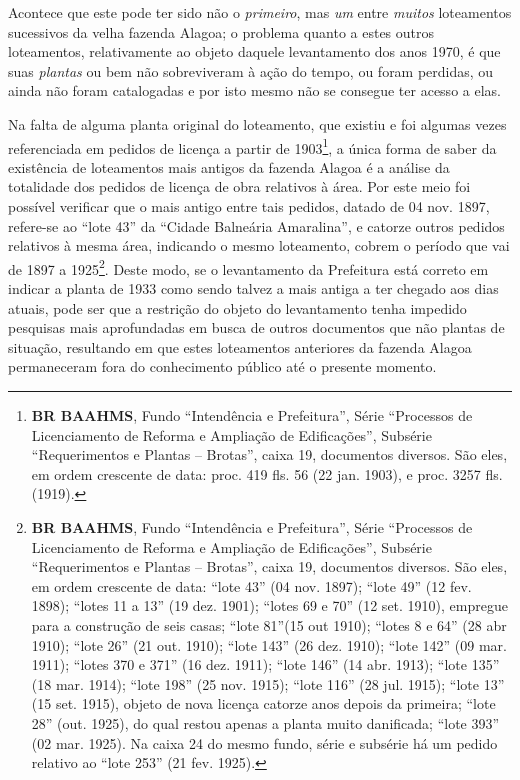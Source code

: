 Acontece que este pode ter sido não o \textit{primeiro}, mas \textit{um} entre \textit{muitos} loteamentos sucessivos da velha fazenda Alagoa; o problema quanto a estes outros loteamentos, relativamente ao objeto daquele levantamento dos anos 1970, é que suas \textit{plantas} ou bem não sobreviveram à ação do tempo, ou foram perdidas, ou ainda não foram catalogadas e por isto mesmo não se consegue ter acesso a elas.

Na falta de alguma planta original do loteamento, que existiu e foi algumas vezes referenciada em pedidos de licença a partir de 1903\footnote{\textbf{BR BAAHMS}, Fundo ``Intendência e Prefeitura'', Série ``Processos de Licenciamento de Reforma e Ampliação de Edificações'', Subsérie ``Requerimentos e Plantas -- Brotas'', caixa 19, documentos diversos. São eles, em ordem crescente de data: proc. 419 fls. 56 (22 jan. 1903), e proc. 3257 fls. (1919).}, a única forma de saber da existência de loteamentos mais antigos da fazenda Alagoa é a análise da totalidade dos pedidos de licença de obra relativos à área. Por este meio foi possível verificar que o mais antigo entre tais pedidos, datado de 04 nov. 1897, refere-se ao ``lote 43'' da ``Cidade Balneária Amaralina'', e catorze outros pedidos relativos à mesma área, indicando o mesmo loteamento, cobrem o período que vai de 1897 a 1925\footnote{\textbf{BR BAAHMS}, Fundo ``Intendência e Prefeitura'', Série ``Processos de Licenciamento de Reforma e Ampliação de Edificações'', Subsérie ``Requerimentos e Plantas -- Brotas'', caixa 19, documentos diversos. São eles, em ordem crescente de data: ``lote 43'' (04 nov. 1897); ``lote 49'' (12 fev. 1898); ``lotes 11 a 13'' (19 dez. 1901); ``lotes 69 e 70'' (12 set. 1910), empregue para a construção de seis casas; ``lote 81''(15 out 1910); ``lotes 8 e 64'' (28 abr 1910); ``lote 26'' (21 out. 1910); ``lote 143'' (26 dez. 1910); ``lote 142'' (09 mar. 1911); ``lotes 370 e 371'' (16 dez. 1911); ``lote 146'' (14 abr. 1913); ``lote 135'' (18 mar. 1914); ``lote 198'' (25 nov. 1915); ``lote 116'' (28 jul. 1915); ``lote 13'' (15 set. 1915), objeto de nova licença catorze anos depois da primeira; ``lote 28'' (out. 1925), do qual restou apenas a planta muito danificada; ``lote 393'' (02 mar. 1925). Na caixa 24 do mesmo fundo, série e subsérie há um pedido relativo ao ``lote 253'' (21 fev. 1925).}. Deste modo, se o levantamento da Prefeitura está correto em indicar a planta de 1933 como sendo talvez a mais antiga a ter chegado aos dias atuais, pode ser que a restrição do objeto do levantamento tenha impedido pesquisas mais aprofundadas em busca de outros documentos que não plantas de situação, resultando em que estes loteamentos anteriores da fazenda Alagoa permaneceram fora do conhecimento público até o presente momento.

